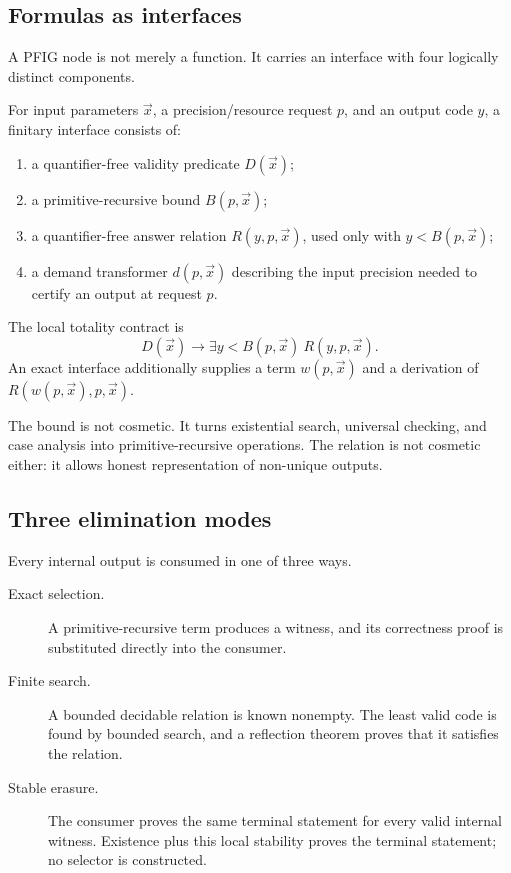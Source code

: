 \subsection{Formulas as interfaces}

A PFIG node is not merely a function.  It carries an interface with four logically distinct components.

\begin{definition}
For input parameters \(\vec{x}\), a precision/resource request \(p\), and an output code \(y\), a finitary interface consists of:
\begin{enumerate}
\item a quantifier-free validity predicate \(D(\vec{x})\);
\item a primitive-recursive bound \(B(p,\vec{x})\);
\item a quantifier-free answer relation \(R(y,p,\vec{x})\), used only with \(y<B(p,\vec{x})\);
\item a demand transformer \(d(p,\vec{x})\) describing the input precision needed to certify an output at request \(p\).
\end{enumerate}
The local totality contract is
\[
  D(\vec{x})\to \exists y<B(p,\vec{x})\ R(y,p,\vec{x}).
\]
An exact interface additionally supplies a term \(w(p,\vec{x})\) and a derivation of \(R(w(p,\vec{x}),p,\vec{x})\).
\end{definition}

The bound is not cosmetic.  It turns existential search, universal checking, and case analysis into primitive-recursive operations.  The relation is not cosmetic either: it allows honest representation of non-unique outputs.

\subsection{Three elimination modes}

Every internal output is consumed in one of three ways.

\begin{description}
\item[Exact selection.] A primitive-recursive term produces a witness, and its correctness proof is substituted directly into the consumer.
\item[Finite search.] A bounded decidable relation is known nonempty.  The least valid code is found by bounded search, and a reflection theorem proves that it satisfies the relation.
\item[Stable erasure.] The consumer proves the same terminal statement for every valid internal witness.  Existence plus this local stability proves the terminal statement; no selector is constructed.
\end{description}

